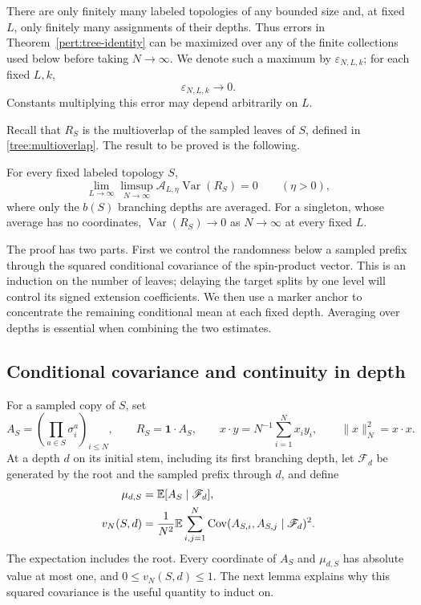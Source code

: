 There are only finitely many labeled topologies of any bounded size and,
at fixed $L$, only finitely many assignments of their depths.  Thus
errors in Theorem~\ref{pert:tree-identity} can be maximized over any
of the finite collections used below before taking $N\to\infty$.
We denote such a maximum by $\varepsilon_{N,L,k}$; for each fixed $L,k$,
\begin{equation}
 \varepsilon_{N,L,k}\longrightarrow0.
 \label{decor:identity-error}
\end{equation}
Constants multiplying this error may depend arbitrarily on $L$.

Recall that $R_S$ is the multioverlap of the sampled leaves of $S$,
defined in \eqref{tree:multioverlap}. The result to be proved is the following.

\begin{theorem}
\label{decor:overlap-concentration}
For every fixed labeled topology $S$,
\begin{equation}
 \lim_{L\to\infty}\limsup_{N\to\infty}
       \mathcal A_{L,\eta}\operatorname{Var}(R_S)=0
       \qquad(\eta>0),
 \label{decor:overlap-concentration-equation}
\end{equation}
where only the $b(S)$ branching depths are averaged. For a
singleton, whose average has no coordinates,
$\operatorname{Var}(R_S)\to0$ as $N\to\infty$ at every fixed $L$.
\end{theorem}

The proof has two parts. First we control the randomness below a
sampled prefix through the squared conditional covariance of the
spin-product vector. This is an induction on the number of leaves;
delaying the target splits by one level will control its signed
extension coefficients. We then use a marker anchor to concentrate the
remaining conditional mean at each fixed depth. Averaging over depths
is essential when combining the two estimates.

\subsection{Conditional covariance and continuity in depth}

For a sampled copy of $S$, set
\[
 A_S=\left(\prod_{a\in S}\sigma_i^a\right)_{i\le N},
 \qquad R_S=\mathbf1\cdot A_S,
 \qquad x\cdot y=N^{-1}\sum_{i=1}^Nx_i y_i,
 \qquad \|x\|_N^2=x\cdot x.
\]
At a depth $d$ on its initial stem, including its first branching depth,
let $\mathscr F_d$ be generated by the root and the sampled prefix through $d$,
and define
\begin{align}
 \mu_{d,S}&=\mathbb E[A_S\mid\mathscr F_d],\notag\\
 v_N(S,d)&=\frac1{N^2}\mathbb E\sum_{i,j=1}^N
  \operatorname{Cov}(A_{S,i},A_{S,j}\mid\mathscr F_d)^2.
 \label{decor:covariance-definition}
\end{align}
The expectation includes the root. Every coordinate of $A_S$ and
$\mu_{d,S}$ has absolute value at most one, and $0\le v_N(S,d)\le1$.
The next lemma explains why this squared covariance is the useful
quantity to induct on.

